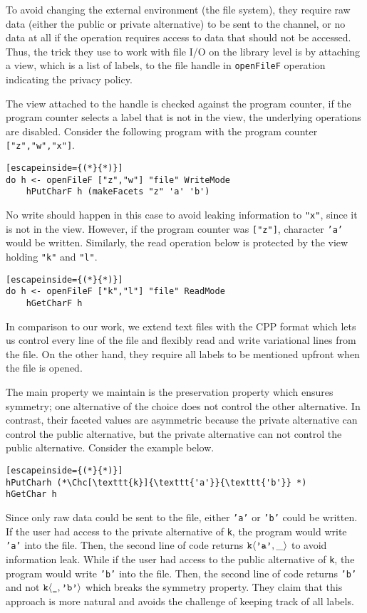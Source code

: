 To avoid changing the external environment (the file system), they require raw data (either the public or private alternative) to be sent to the channel, or no data at all if the operation requires access to data that should not be accessed. Thus, the trick they use to work with file I/O on the library level is by attaching a view, which is a list of labels, to the file handle in \texttt{openFileF} operation indicating the privacy policy. 

The view attached to the handle is checked against the program counter, if the program counter selects a label that is not in the view, the underlying operations are disabled. Consider the following program with the program counter \texttt{["z","w","x"]}.
%
\begin{lstlisting}[escapeinside={(*}{*)}]
do h <- openFileF ["z","w"] "file" WriteMode
    hPutCharF h (makeFacets "z" 'a' 'b') 
\end{lstlisting}
%
No write should happen in this case to avoid leaking information to \texttt{"x"}, since it is not in the view. However, if the program counter was \texttt{["z"]}, character \texttt{'a'} would be written. 
%
Similarly, the read operation below is protected by the view holding \texttt{"k"} and \texttt{"l"}.
%
\begin{lstlisting}[escapeinside={(*}{*)}]
do h <- openFileF ["k","l"] "file" ReadMode
    hGetCharF h 
\end{lstlisting}
%
In comparison to our work, we extend text files with the CPP format which lets us control every line of the file and flexibly read and write variational lines from the file. On the other hand, they require all labels to be mentioned upfront when the file is opened.

The main property we maintain is the preservation property which ensures symmetry; one alternative of the choice does not control the other alternative. In contrast, their faceted values are asymmetric because the private alternative can control the public alternative, but the private alternative can not control the public alternative. Consider the example below. 

\begin{lstlisting}[escapeinside={(*}{*)}]
hPutCharh (*\Chc[\texttt{k}]{\texttt{'a'}}{\texttt{'b'}} *)
hGetChar h
\end{lstlisting}
%
Since only raw data could be sent to the file, either \texttt{'a'} or \texttt{'b'} could be written. If the user had access to the private alternative of \texttt{k}, the program would write \texttt{'a'} into the file. Then, the second line of code returns $\Chc[\texttt{k}]{\texttt{'a'}}{\_}$ to avoid information leak. While if the user had access to the public alternative of \texttt{k}, the program would write \texttt{'b'} into the file. Then, the second line of code returns \texttt{'b'} and not $\Chc[\texttt{k}]{\texttt{\_}}{\texttt{'b'}}$ which breaks the symmetry property. They claim that this approach is more natural and avoids the challenge of keeping track of all labels. 

